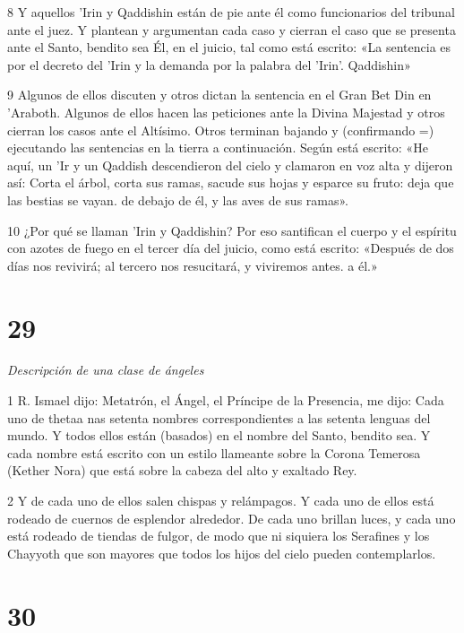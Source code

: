 \par 8 Y aquellos 'Irin y Qaddishin están de pie ante él como funcionarios del tribunal ante el juez. Y plantean y argumentan cada caso y cierran el caso que se presenta ante el Santo, bendito sea Él, en el juicio, tal como está escrito: «La sentencia es por el decreto del 'Irin y la demanda por la palabra del 'Irin'. Qaddishin»

\par 9 Algunos de ellos discuten y otros dictan la sentencia en el Gran Bet Din en 'Araboth. Algunos de ellos hacen las peticiones ante la Divina Majestad y otros cierran los casos ante el Altísimo. Otros terminan bajando y (confirmando =) ejecutando las sentencias en la tierra a continuación. Según está escrito: «He aquí, un 'Ir y un Qaddish descendieron del cielo y clamaron en voz alta y dijeron así: Corta el árbol, corta sus ramas, sacude sus hojas y esparce su fruto: deja que las bestias se vayan. de debajo de él, y las aves de sus ramas».

\par 10 ¿Por qué se llaman 'Irin y Qaddishin? Por eso santifican el cuerpo y el espíritu con azotes de fuego en el tercer día del juicio, como está escrito: «Después de dos días nos revivirá; al tercero nos resucitará, y viviremos antes. a él.»

\chapter{29}

\par \textit{Descripción de una clase de ángeles}

\par 1 R. Ismael dijo: Metatrón, el Ángel, el Príncipe de la Presencia, me dijo: Cada uno de thetaa nas setenta nombres correspondientes a las setenta lenguas del mundo. Y todos ellos están (basados) en el nombre del Santo, bendito sea. Y cada nombre está escrito con un estilo llameante sobre la Corona Temerosa (Kether Nora) que está sobre la cabeza del alto y exaltado Rey.

\par 2 Y de cada uno de ellos salen chispas y relámpagos. Y cada uno de ellos está rodeado de cuernos de esplendor alrededor. De cada uno brillan luces, y cada uno está rodeado de tiendas de fulgor, de modo que ni siquiera los Serafines y los Chayyoth que son mayores que todos los hijos del cielo pueden contemplarlos.

\chapter{30}

